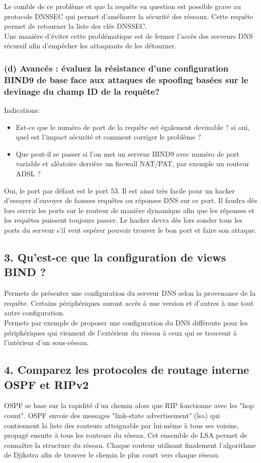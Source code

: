 \documentclass{article}
\begin{document}
Le comble de ce problème et que la requête en question est possible grave au protocole DNSSEC qui permet d'améliorer la sécurité des réseaux. Cette requête permet de retourner la liste des clés DNSSEC.\\

Une manière d'éviter cette problématique est de fermer l'accès des serveurs DNS récursif afin d'empêcher les attaquants de les détourner.\\

\subsubsection*{(d) Avancés : évaluez la résistance d’une configuration BIND9 de base face aux attaques de spoofing basées sur le devinage du champ ID de la requête?}
Indications:
\begin{itemize}
\item Est-ce que le numéro de port de la requête est également devinable ? si oui, quel est l’impact sécurité et comment corriger le problème ?
\item Que peut-il se passer si l’on met un serveur BIND9 avec numéro de port variable et aléatoire derrière un firewall NAT/PAT, par exemple un routeur ADSL ?
\end{itemize}

Oui, le port par défaut est le port 53. Il est ainsi très facile pour un hacker d'essayer d'envoyer de fausses requêtes ou réponses DNS sur ce port. Il faudra dès lors ouvrir les ports sur le routeur de manière dynamique afin que les réponses et les requêtes puissent toujours passer. Le hacker devra dès lors sonder tous les ports du serveur s'il veut espérer pouvoir trouver le bon port et faire son attaque.

\subsection*{3. Qu’est-ce que la configuration de views BIND ?}
Permets de présenter une configuration du serveur DNS selon la provenance de la requête. Certains périphériques auront accès à une version et d'autres à une tout autre configuration.\cite{views}\\

Permets par exemple de proposer une configuration du DNS différente pour les périphériques qui viennent de l'extérieur du réseau à ceux qui se trouvent à l'intérieur d'un sous-réseau.

\subsection*{4. Comparez les protocoles de routage interne OSPF et RIPv2}
OSPF\cite{OSPF} se base sur la rapidité d'un chemin alors que RIP\cite{RIP} fonctionne avec les "hop count". OSPF envoie des messages "link-state advertisement" (lsa) qui contiennent la liste des routeurs atteignable par lui-même à tous ses voisins, propagé ensuite à tous les routeurs du réseau. Cet ensemble de LSA permet de connaître la structure du réseau. Chaque routeur utilisant finalement l'algorithme de Djikstra afin de trouver le chemin le plus court vers chaque réseau.\\
\end{document}
